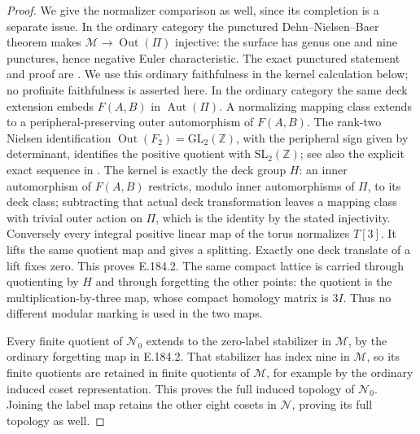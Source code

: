 \begin{proof}
We give the normalizer comparison as well, since its
completion is a separate issue.  In the ordinary category
the punctured Dehn--Nielsen--Baer theorem makes
\(\mathcal M\to\operatorname{Out}(\Pi)\) injective:
the surface has genus one and nine punctures, hence
negative Euler characteristic.  The exact punctured
statement and proof are
\citet[version 5.0, \S8.2.7, Theorem 8.8,
pp.245--246]{LitFarbMargalit2011Version5}.
We use this ordinary faithfulness in the kernel calculation
below; no profinite faithfulness is asserted here.
In the ordinary category
the same deck extension embeds \(F(A,B)\) in
\(\operatorname{Aut}(\Pi)\).  A normalizing mapping class
extends to a peripheral-preserving outer automorphism of
\(F(A,B)\).  The rank-two Nielsen identification
\(\operatorname{Out}(F_2)=\mathrm{GL}_2(\mathbb Z)\),
with the peripheral sign given by determinant, identifies
the positive quotient with \(\mathrm{SL}_2(\mathbb Z)\);
see also the explicit exact sequence in
\citet[\S3, p.335]{LitBuxErshovRapinchuk2011}.
The kernel is exactly the deck group \(H\): an inner
automorphism of \(F(A,B)\) restricts, modulo inner
automorphisms of \(\Pi\), to its deck class; subtracting
that actual deck transformation leaves a mapping class
with trivial outer action on \(\Pi\), which is the
identity by the stated injectivity.
Conversely every integral positive linear map of the
torus normalizes \(T[3]\).  It lifts the same quotient
map and gives a splitting.  Exactly one deck translate
of a lift fixes zero.  This proves E.184.2.
The same compact lattice is carried through quotienting
by \(H\) and through forgetting the other points: the
quotient is the multiplication-by-three map, whose
compact homology matrix is \(3I\).  Thus no different
modular marking is used in the two maps.

Every finite quotient of \(\mathcal N_0\) extends to
the zero-label stabilizer in \(\mathcal M\), by the
ordinary forgetting map in E.184.2.
That stabilizer has index nine in \(\mathcal M\), so
its finite quotients are retained in finite quotients
of \(\mathcal M\), for example by the ordinary induced
coset representation.  This proves the full induced
topology of \(\mathcal N_0\).
Joining the label map retains the other eight cosets
in \(\mathcal N\), proving its full topology as well.


\end{proof}
